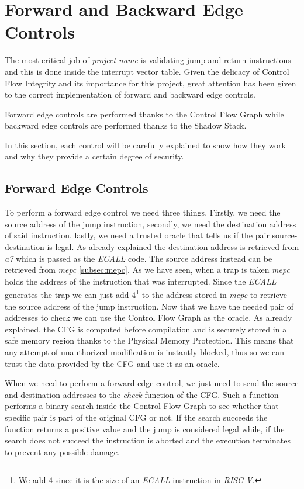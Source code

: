 \section{Forward and Backward Edge Controls}
\label{sec:project_controls}

The most critical job of \textit{project name} is validating jump and return instructions
and this is done inside the interrupt vector table. Given the delicacy of
Control Flow Integrity and its importance for this project, great attention has been
given to the correct implementation of forward and backward edge controls.

Forward edge controls are performed thanks to the Control Flow Graph while backward
edge controls are performed thanks to the Shadow Stack.

In this section, each control will be carefully explained to show how they work
and why they provide a certain degree of security.

\subsection{Forward Edge Controls}
\label{subsec:forward}

To perform a forward edge control we need three things. Firstly, we need the source
address of the jump instruction, secondly, we need the destination address of said
instruction, lastly, we need a trusted oracle that tells us if the pair source-destination
is legal. As already explained the destination address is retrieved from \textit{a7}
which is passed as the \textit{ECALL} code. The source address instead can be retrieved
from \textit{mepc} \ref{subsec:mepc}. As we have seen, when a trap is taken
\textit{mepc} holds the address of the instruction that was interrupted. Since
the \textit{ECALL} generates the trap we can just add $4$\footnote{We add $4$
since it is the size of an \textit{ECALL} instruction in \textit{RISC-V}.} to
the address stored in \textit{mepc} to retrieve the source address of the jump instruction.
Now that we have the needed pair of addresses to check we can use the Control
Flow Graph as the oracle. As already explained, the CFG is computed before
compilation and is securely stored in a safe memory region thanks to the
Physical Memory Protection. This means that any attempt of unauthorized modification
is instantly blocked, thus so we can trust the data provided by the CFG and use
it as an oracle.

When we need to perform a forward edge control, we just need to send the source and
destination addresses to the \textit{check} function of the CFG. Such a function
performs a binary search inside the Control Flow Graph to see whether that specific
pair is part of the original CFG or not. If the search succeeds the function
returns a positive value and the jump is considered legal while, if the search does
not succeed the instruction is aborted and the execution terminates to prevent any
possible damage.

